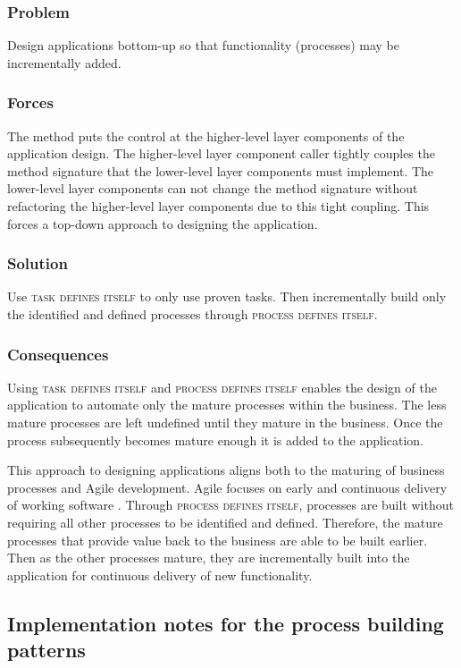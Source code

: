 \documentclass[prodmode]{style/acmlarge}
\begin{document}
\subsubsection*{\textbf{Problem}} Design applications bottom-up so that
functionality (processes) may be incrementally added.

\subsubsection*{Forces} The method puts the control at the higher-level layer
components of the application design.  The higher-level layer component caller
tightly couples the method signature that the lower-level layer components must
implement.  The lower-level layer components can not change the method signature
without refactoring the higher-level layer components due to this tight
coupling.  This forces a top-down approach to designing the application.

\subsubsection*{\textbf{Solution}} Use \textsc{task defines itself} to only use
proven tasks.  Then incrementally build only the identified and defined
processes through \textsc{process defines itself}.

\subsubsection*{Consequences} Using \textsc{task defines itself} and
\textsc{process defines itself} enables the design of the application to
automate only the mature processes within the business.  The less mature
processes are left undefined until they mature in the business.  Once the
process subsequently becomes mature enough it is added to the application.

This approach to designing applications aligns both to the maturing of business
processes and Agile development.  Agile focuses on early and continuous delivery
of working software \cite{agile-manifesto}.  Through \textsc{process defines
itself}, processes are built without requiring all other processes to be
identified and defined.  Therefore, the mature processes that provide value back
to the business are able to be built earlier.  Then as the other processes
mature, they are incrementally built into the application for continuous
delivery of new functionality.


\subsection{\textbf{Implementation notes for the process building patterns}}
\end{document}
